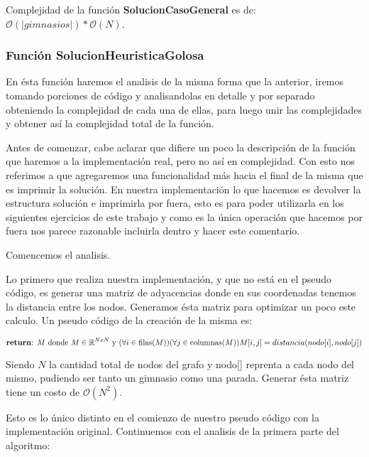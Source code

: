 Complejidad de la función \textbf{SolucionCasoGeneral} es de: $\mathcal{O}(|gimnasios|) * \mathcal{O}(N)$.


\subsubsection{Función SolucionHeuristicaGolosa}


En ésta función haremos el analisis de la misma forma que la anterior, iremos tomando porciones de código y analisandolas en detalle y por separado obteniendo la complejidad de cada una de ellas, para luego unir las complejidades y obtener así la complejidad total de la función.

Antes de comenzar, cabe aclarar que difiere un poco la descripción de la función que haremos a la implementación real, pero no así en complejidad. Con esto nos referimos a que agregaremos una funcionalidad más hacia el final de la misma que es imprimir la solución. En nuestra implementación lo que hacemos es devolver la estructura solución e imprimirla por fuera, esto es para poder utilizarla en los siguientes ejercicios de este trabajo y como es la única operación que hacemos por fuera nos parece razonable incluirla dentro y hacer este comentario.

Comencemos el analisis.

Lo primero que realiza nuestra implementación, y que no está en el pseudo código, es generar una matriz de adyacencias donde en sus coordenadas tenemos la distancia entre los nodos. Generamos ésta matriz para optimizar un poco este calculo. Un pseudo código de la creación de la misma es:

\[
	\text{\textbf{return}:  } M \text{ donde } M \in \mathbb{R}^{NxN} \text{ y } (\forall i \in \text{filas($M$)})(\forall j \in \text{columnas($M$)}) M[i,j] = distancia(nodo[i], nodo[j])
\]

Siendo $N$ la cantidad total de nodos del grafo y nodo[] reprenta a cada nodo del mismo, pudiendo ser tanto un gimnasio como una parada. Generar ésta matriz tiene un costo de $\mathcal{O}(N^2)$.

Esto es lo único distinto en el comienzo de nuestro pseudo código con la implementación original. Continuemos con el analisis de la primera parte del algoritmo:

